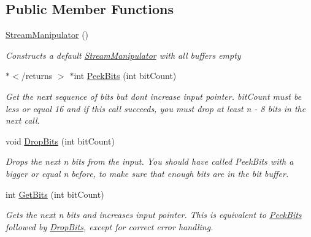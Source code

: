 \subsection*{Public Member Functions}
\begin{DoxyCompactItemize}
\item 
\hyperlink{class_i_c_sharp_code_1_1_sharp_zip_lib_1_1_zip_1_1_compression_1_1_streams_1_1_stream_manipulator_a0bf52b7e926dbf3f3d7562ff1349106e}{Stream\+Manipulator} ()
\begin{DoxyCompactList}\small\item\em Constructs a default \hyperlink{class_i_c_sharp_code_1_1_sharp_zip_lib_1_1_zip_1_1_compression_1_1_streams_1_1_stream_manipulator}{Stream\+Manipulator} with all buffers empty \end{DoxyCompactList}\item 
$\ast$$<$/returns $>$ $\ast$int \hyperlink{class_i_c_sharp_code_1_1_sharp_zip_lib_1_1_zip_1_1_compression_1_1_streams_1_1_stream_manipulator_acffdc659e2508d7642be37f3c0fa1ec0}{Peek\+Bits} (int bit\+Count)
\begin{DoxyCompactList}\small\item\em Get the next sequence of bits but don\textquotesingle{}t increase input pointer. bit\+Count must be less or equal 16 and if this call succeeds, you must drop at least n -\/ 8 bits in the next call. \end{DoxyCompactList}\item 
void \hyperlink{class_i_c_sharp_code_1_1_sharp_zip_lib_1_1_zip_1_1_compression_1_1_streams_1_1_stream_manipulator_a133a3593f65193421981087e5f32b6a3}{Drop\+Bits} (int bit\+Count)
\begin{DoxyCompactList}\small\item\em Drops the next n bits from the input. You should have called Peek\+Bits with a bigger or equal n before, to make sure that enough bits are in the bit buffer. \end{DoxyCompactList}\item 
int \hyperlink{class_i_c_sharp_code_1_1_sharp_zip_lib_1_1_zip_1_1_compression_1_1_streams_1_1_stream_manipulator_a2e01ba3e4c4dc842b4f230e04d45f415}{Get\+Bits} (int bit\+Count)
\begin{DoxyCompactList}\small\item\em Gets the next n bits and increases input pointer. This is equivalent to \hyperlink{class_i_c_sharp_code_1_1_sharp_zip_lib_1_1_zip_1_1_compression_1_1_streams_1_1_stream_manipulator_acffdc659e2508d7642be37f3c0fa1ec0}{Peek\+Bits} followed by \hyperlink{class_i_c_sharp_code_1_1_sharp_zip_lib_1_1_zip_1_1_compression_1_1_streams_1_1_stream_manipulator_a133a3593f65193421981087e5f32b6a3}{Drop\+Bits}, except for correct error handling. \end{DoxyCompactList}\item 
$$
\end{DoxyCompactItemize}
